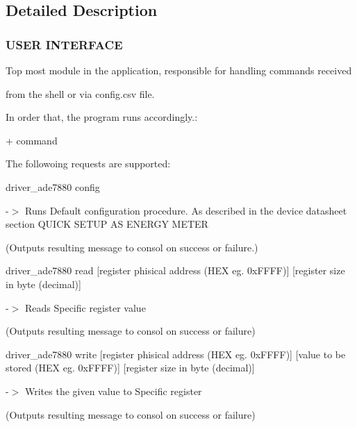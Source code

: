 \subsection{Detailed Description}


 \hypertarget{Module1}{}\subsubsection{U\-S\-E\-R I\-N\-T\-E\-R\-F\-A\-C\-E}\label{Module1}
Top most module in the application, responsible for handling commands received \par
 from the shell or via config.\-csv file.

In order that, the program runs accordingly.\-:

\begin{DoxyVerb}[executable] + command \end{DoxyVerb}
 \par
 The followoing requests are supported\-:

\begin{DoxyVerb}driver_ade7880  config \end{DoxyVerb}


-\/$>$ Runs Default configuration procedure. As described in the device datasheet section Q\-U\-I\-C\-K S\-E\-T\-U\-P A\-S E\-N\-E\-R\-G\-Y M\-E\-T\-E\-R \par
 (Outputs resulting message to consol on success or failure.)\par
\par


\begin{DoxyVerb}driver_ade7880  read  [register phisical address (HEX eg. 0xFFFF)] [register size in byte (decimal)]  \end{DoxyVerb}
 -\/$>$ Reads Specific register value \par
 (Outputs resulting message to consol on success or failure)\par
\par


\begin{DoxyVerb}driver_ade7880  write [register phisical address (HEX eg. 0xFFFF)] [value to be stored (HEX eg. 0xFFFF)] [register size in byte (decimal)]  \end{DoxyVerb}
 -\/$>$ Writes the given value to Specific register \par
 (Outputs resulting message to consol on success or failure)\par
\par


